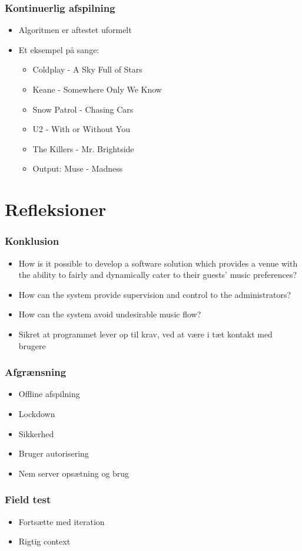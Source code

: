 \begin{frame}
	\frametitle{Kontinuerlig afspilning}
	\begin{itemize}
		\item Algoritmen er aftestet uformelt
		\item Et eksempel på sange:
		\begin{itemize}
		\item Coldplay - A Sky Full of Stars
		\item Keane - Somewhere Only We Know
		\item Snow Patrol - Chasing Cars
		\item U2 - With or Without You
		\item The Killers - Mr. Brightside 
		\item Output: Muse - Madness
		\end{itemize}
	\end{itemize}
\end{frame}



\section{Refleksioner}

\begin{frame}
	\frametitle{Konklusion}
	\begin{itemize}
		\item How is it possible to develop a software solution which provides a venue with the ability to fairly and dynamically cater to their guests’ music preferences?
		\item How can the system provide supervision and control to the administrators?
		\item How can the system avoid undesirable music flow?
		\item Sikret at programmet lever op til krav, ved at være i tæt kontakt med brugere
	\end{itemize}
\end{frame}

\begin{frame}
	\frametitle{Afgrænsning}
	\begin{itemize}
		\item Offline afspilning
		\item Lockdown
		\item Sikkerhed
		\item Bruger autorisering
		\item Nem server opsætning og brug
	\end{itemize}
\end{frame}

\begin{frame}
	\frametitle{Field test}
	\begin{itemize}
		\item Fortsætte med iteration
		\item Rigtig context
	\end{itemize}
\end{frame}

{\aauwavesbg
\begin{frame}
	\titlepage
\end{frame}}